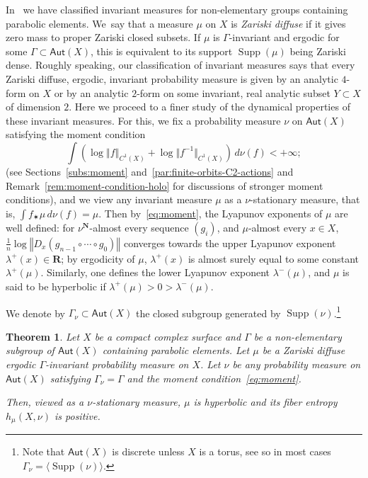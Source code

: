 \documentclass[JEP,XML,SOM,Unicode,published]{cedram}
\newcommand{\norm}[1]{{\left\Vert#1\right\Vert}}
\newcommand{\anorm}[1]{{\Vert#1\Vert}}
\newcommand{\lrpar}[1]{\left(#1\right)}
\newcommand{\inv}{^{-1}}
\DeclareMathOperator{\supp}{Supp}
\def\R{\mathbf{R}}
\def\N{\mathbf{N}}
\newcommand\Aut{\mathsf{Aut}}
\theoremstyle{plain}
\newtheorem{thm}{Theorem}[section]
\theoremstyle{definition}
\begin{document}
In~\cite{invariant} we have classified
invariant measures for non-elementary groups containing parabolic elements. We~say
that a measure $\mu$ on $X$ is
{\emph{Zariski diffuse}}
if it gives zero mass to proper Zariski closed subsets. If $\mu$ is $\Gamma$-invariant and ergodic for some
$\Gamma\subset \Aut(X)$, this is equivalent to its support $\supp(\mu)$
being Zariski dense. Roughly speaking, our classification of invariant measures says that every Zariski diffuse, ergodic, invariant probability measure is
given by an analytic $4$-form on $X$ or by an analytic $2$-form on some invariant, real analytic subset $Y\subset X$ of dimension $2$.
Here we proceed to a finer study of the dynamical properties of these invariant measures. For this, we
fix a probability measure $\nu$ on $\Aut(X)$ satisfying the moment condition
\begin{equation}\label{eq:moment}
\tag{M}
\int \lrpar{\log\norm{f}_{C^1(X)}+ \log\anorm{f\inv}_{C^1(X)}} \, d\nu (f) < + \infty;
\end{equation}
(see Sections~\ref{subs:moment} and~\ref{par:finite-orbits-C2-actions} and Remark~\ref{rem:moment-condition-holo} for discussions of stronger moment conditions),
and we view any invariant measure $\mu$
as a $\nu$-stationary measure, that is,
$\int f_\varstar\mu \, d\nu(f) = \mu$. Then by~\eqref{eq:moment},
the Lyapunov exponents of $\mu$ are well defined: for $\nu^\N$-almost every sequence $(g_i)$,
and $\mu$-almost every $x\in X$, $\frac{1}{n}\log \norm{D_x(g_{n-1}\circ \cdots \circ g_0)}$ converges towards the upper Lyapunov exponent $\lambda^+(x)\in \R$; by ergodicity of $\mu$, $\lambda^+(x)$ is almost surely equal to some constant $\lambda^+(\mu)$. Similarly, one defines the lower Lyapunov exponent $\lambda^-(\mu)$, and $\mu$ is said to be hyperbolic if $\lambda^+(\mu)>0>\lambda^-(\mu)$.

We denote by $\Gamma_\nu \subset \Aut(X)$
the closed subgroup generated by $\supp(\nu)$.\footnote{\label{page:discrete}Note that $\Aut(X)$ is discrete unless
$X$ is a torus, see \cite[\S 3]{stiffness}
so in most cases $\Gamma_\nu = \langle \supp(\nu) \rangle$.}

\begin{thm}\label{thm:hyperbolic}
Let $X$ be a compact complex surface and
$\Gamma$ be a non-elementary subgroup of $\Aut(X)$ containing parabolic elements.
Let $\mu$ be a Zariski diffuse ergodic $\Gamma$-invariant probability measure on $X$.
Let $\nu$ be any probability measure on $\Aut(X)$
satisfying $\Gamma_\nu=\Gamma$ and the moment condition~\eqref{eq:moment}.

Then, viewed as a $\nu$-stationary measure, $\mu$ is hyperbolic and its fiber entropy $h_\mu(X,\nu)$ is positive.
\end{thm}
\end{document}
